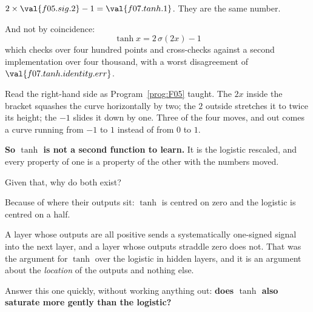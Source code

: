 \begin{fr}
\begin{ansblock}
$2 \times \val{f05.sig.2} - 1 = \val{f07.tanh.1}$. They are the same number.
\end{ansblock}

And not by coincidence:
\[ \tanh x = 2\,\sigma(2x) - 1 \]
which  checks over four hundred points and
cross-checks against a second implementation over four thousand, with a worst
disagreement of $\val{f07.tanh.identity.err}$.

Read the right-hand side as Program~\ref{prog:F05} taught. The $2x$ inside the
bracket squashes the curve horizontally by two; the $2$ outside stretches it
to twice its height; the $-1$ slides it down by one. Three of the four moves,
and out comes a curve running from $-1$ to $1$ instead of from $0$ to $1$.

\textbf{So $\tanh$ is not a second function to learn.} It is the logistic
rescaled, and every property of one is a property of the other with the
numbers moved.

Given that, why do both exist?
\nextframe
\end{fr}

\begin{fr}
\begin{ansblock}
Because of where their outputs sit: $\tanh$ is centred on zero and the
logistic is centred on a half.
\end{ansblock}

A layer whose outputs are all positive sends a systematically one-signed
signal into the next layer, and a layer whose outputs straddle zero does not.
That was the argument for $\tanh$ over the logistic in hidden layers, and it is
an argument about the \emph{location} of the outputs and nothing else.

Answer this one quickly, without working anything out:
\textbf{does $\tanh$ also saturate more gently than the logistic?}
\dotline
\nextframe
\end{fr}

